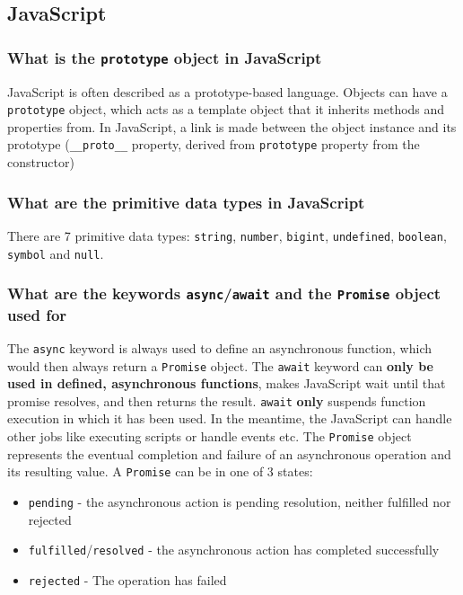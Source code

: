 \documentclass[12pt, a4paper]{article}
\newcommand{\code}[1]{\texttt{#1}}
\begin{document}
\pagebreak
\subsection*{JavaScript}
\subsubsection*{What is the \code{prototype} object in JavaScript}
JavaScript is often described as a prototype-based language.
Objects can have a \code{prototype} object, which acts as a template object that it inherits methods and properties from.
In JavaScript, a link is made between the object instance and its prototype (\code{\_\_proto\_\_} property, derived from \code{prototype} property from the constructor)

\subsubsection*{What are the primitive data types in JavaScript}
There are 7 primitive data types: \code{string}, \code{number}, \code{bigint}, \code{undefined}, \code{boolean}, \code{symbol} and \code{null}.

\subsubsection*{What are the keywords \code{async}/\code{await} and the \code{Promise} object used for}
The \code{async} keyword is always used to define an asynchronous function, which would then always return a \code{Promise} object.\newline
The \code{await} keyword can \textbf{only be used in defined, asynchronous functions}, makes JavaScript wait until that promise resolves, and then returns the result.
\code{await} \textbf{only} suspends function execution in which it has been used.
In the meantime, the JavaScript can handle other jobs like executing scripts or handle events etc.\newline
The \code{Promise} object represents the eventual completion and failure of an asynchronous operation and its resulting value.
A \code{Promise} can be in one of 3 states:
\begin{itemize}
    \item \code{pending} - the asynchronous action is pending resolution, neither fulfilled nor rejected
    \item \code{fulfilled}/\code{resolved} - the asynchronous action has completed successfully
    \item \code{rejected} - The operation has failed
\end{itemize}
\end{document}
